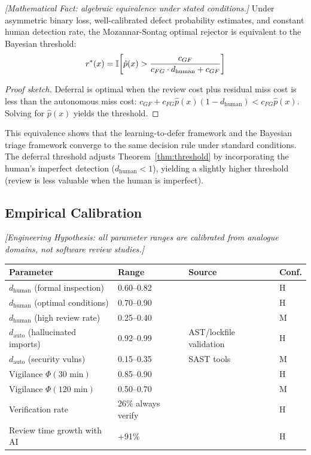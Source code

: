 \begin{theorem}
\emph{[Mathematical Fact: algebraic equivalence under stated conditions.]}
\label{thm:deferral-equivalence}
Under asymmetric binary loss, well-calibrated defect probability estimates, and constant human detection rate, the Mozannar-Sontag optimal rejector is equivalent to the Bayesian threshold:
\begin{equation}
r^*(x) = \mathbb{I}\!\left[\hat{p}(x) > \frac{c_{GF}}{c_{FG} \cdot d_{\textup{human}} + c_{GF}}\right]
\end{equation}
\end{theorem}

\begin{proof}[Proof sketch]
Deferral is optimal when the review cost plus residual miss cost is less than the autonomous miss cost: $c_{GF} + c_{FG}\hat{p}(x)(1-d_{\text{human}}) < c_{FG}\hat{p}(x)$. Solving for $\hat{p}(x)$ yields the threshold.
\end{proof}

This equivalence shows that the learning-to-defer framework and the Bayesian triage framework converge to the same decision rule under standard conditions. The deferral threshold adjusts Theorem~\ref{thm:threshold} by incorporating the human's imperfect detection ($d_{\text{human}} < 1$), yielding a slightly higher threshold (review is less valuable when the human is imperfect).

\subsection{Empirical Calibration}

\emph{[Engineering Hypothesis: all parameter ranges are calibrated from analogue domains, not software review studies.]}

\begin{center}
\small
\begin{tabular}{llll}
\toprule
\textbf{Parameter} & \textbf{Range} & \textbf{Source} & \textbf{Conf.} \\
\midrule
$d_{\text{human}}$ (formal inspection) & 0.60--0.82 & \citet{fagan1976design, jones1996software} & H \\
$d_{\text{human}}$ (optimal conditions) & 0.70--0.90 & \citet{cohen2006best} & H \\
$d_{\text{human}}$ (high review rate) & 0.25--0.40 & \citet{cohen2006best} & M \\
$d_{\text{auto}}$ (hallucinated imports) & 0.92--0.99 & AST/lockfile validation & H \\
$d_{\text{auto}}$ (security vulns) & 0.15--0.35 & SAST tools & M \\
Vigilance $\Phi(30\text{ min})$ & 0.85--0.90 & \citet{mackworth1948breakdown} & H \\
Vigilance $\Phi(120\text{ min})$ & 0.50--0.70 & \citet{mackworth1948breakdown} & M \\
Verification rate & 26\% always verify & \citet{sonar2026} & H \\
Review time growth with AI & +91\% & \citet{dora2025} & H \\
\bottomrule
\end{tabular}
\end{center}

